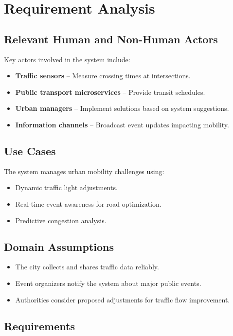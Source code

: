 \documentclass[a4paper,12pt]{article}
\begin{document}
\newpage

\section{Requirement Analysis}
\subsection{Relevant Human and Non-Human Actors}
Key actors involved in the system include:
\begin{itemize}
    \item \textbf{Traffic sensors} – Measure crossing times at intersections.
    \item \textbf{Public transport microservices} – Provide transit schedules.
    \item \textbf{Urban managers} – Implement solutions based on system suggestions.
    \item \textbf{Information channels} – Broadcast event updates impacting mobility.
\end{itemize}

\subsection{Use Cases}
The system manages urban mobility challenges using:
\begin{itemize}
    \item Dynamic traffic light adjustments.
    \item Real-time event awareness for road optimization.
    \item Predictive congestion analysis.
\end{itemize}

\subsection{Domain Assumptions}
\begin{itemize}
    \item The city collects and shares traffic data reliably.
    \item Event organizers notify the system about major public events.
    \item Authorities consider proposed adjustments for traffic flow improvement.
\end{itemize}

\subsection{Requirements}
\end{document}
